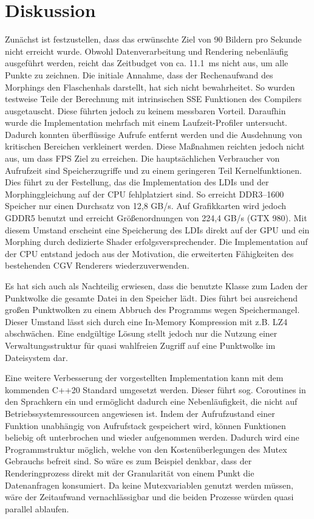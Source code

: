 \documentclass[hyperref, beleg, german]{cgvpub}
\begin{document}
\section{Diskussion}%
\label{sec:discussion}

Zunächst ist festzustellen, dass das erwünschte Ziel von 90 Bildern pro Sekunde
nicht erreicht wurde. Obwohl Datenverarbeitung und Rendering nebenläufig
ausgeführt werden, reicht das Zeitbudget von ca. \SI{11,1}{\milli\second} nicht
aus, um alle Punkte zu zeichnen. Die initiale Annahme, dass der Rechenaufwand
des Morphings den Flaschenhals darstellt, hat sich nicht bewahrheitet. So
wurden testweise Teile der Berechnung mit intrinsischen SSE Funktionen des
Compilers ausgetauscht. Diese führten jedoch zu keinem messbaren Vorteil.
Daraufhin wurde die Implementation mehrfach mit einem Laufzeit-Profiler
untersucht. Dadurch konnten überflüssige Aufrufe entfernt werden und die
Ausdehnung von kritischen Bereichen verkleinert werden. Diese Maßnahmen
reichten jedoch nicht aus, um dass FPS Ziel zu erreichen. Die hauptsächlichen
Verbraucher von Aufrufzeit sind Speicherzugriffe und zu einem geringeren Teil
Kernelfunktionen. Dies führt zu der Festellung, das die Implementation des LDIs
und der Morphinggleichung auf der CPU fehlplatziert sind. So erreicht
DDR3--1600 Speicher nur einen Durchsatz von 12,8 GB/s. Auf Grafikkarten wird
jedoch GDDR5 benutzt und erreicht Größenordnungen von 224,4 GB/s (GTX 980). Mit
diesem Umstand erscheint eine Speicherung des LDIs direkt auf der GPU und ein
Morphing durch dedizierte Shader erfolgsversprechender. Die Implementation auf
der CPU entstand jedoch aus der Motivation, die erweiterten Fähigkeiten des
bestehenden CGV Renderers wiederzuverwenden.

Es hat sich auch als Nachteilig erwiesen, dass die benutzte Klasse zum Laden
der Punktwolke die gesamte Datei in den Speicher lädt. Dies führt bei
ausreichend großen Punktwolken zu einem Abbruch des Programms wegen
Speichermangel. Dieser Umstand lässt sich durch eine In-Memory Kompression mit
z.B. LZ4 abschwächen. Eine endgültige Lösung stellt jedoch nur die Nutzung
einer Verwaltungsstruktur für quasi wahlfreien Zugriff auf eine Punktwolke im
Dateisystem dar.

Eine weitere Verbesserung der vorgestellten Implementation kann mit dem
kommenden C++20 Standard umgesetzt werden. Dieser führt sog. Coroutines in den
Sprachkern ein und ermöglicht dadurch eine Nebenläufigkeit, die nicht auf
Betriebssystemressourcen angewiesen ist. Indem der Aufrufzustand einer Funktion
unabhängig von Aufrufstack gespeichert wird, können Funktionen beliebig oft
unterbrochen und wieder aufgenommen werden. Dadurch wird eine Programmstruktur
möglich, welche von den Kostenüberlegungen des Mutex Gebrauchs befreit sind. So
wäre es zum Beispiel denkbar, dass der Renderingprozess direkt mit der
Granularität von einem Punkt die Datenanfragen konsumiert. Da keine
Mutexvariablen genutzt werden müssen, wäre der Zeitaufwand vernachlässigbar und
die beiden Prozesse würden quasi parallel ablaufen.
\end{document}
